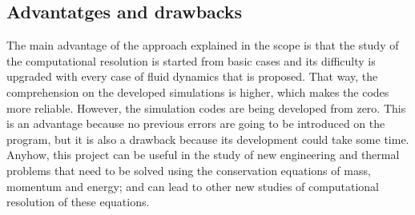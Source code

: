 \subsection{Advantatges and drawbacks}
The main advantage of the approach explained in the scope is that the study of the computational resolution is started from basic cases and its difficulty is upgraded with every case of fluid dynamics that is proposed. That way, the comprehension on the developed simulations is higher, which makes the codes more reliable. However, the simulation codes are being developed from zero. This is an advantage because no previous errors are going to be introduced on the program, but it is also a drawback because its development could take some time.
\newline
\newline
Anyhow, this project can be useful in the study of new engineering and thermal problems that need to be solved using the conservation equations of mass, momentum and energy; and can lead to other new studies of computational resolution of these equations.
